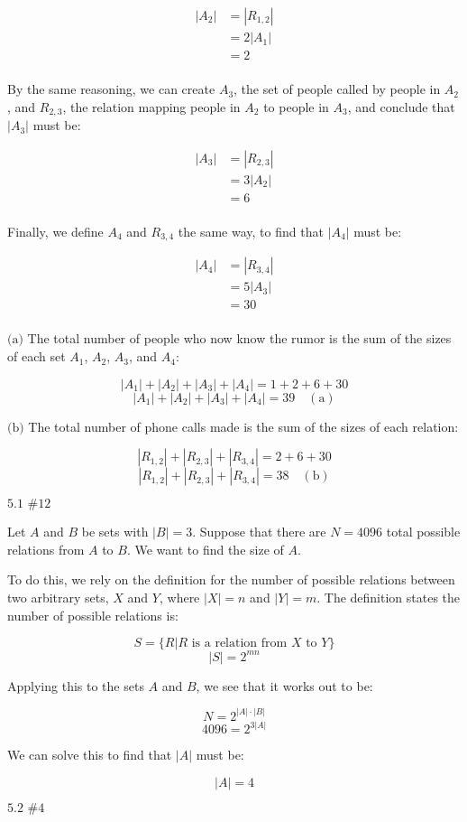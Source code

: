 \documentclass{article}
\newcommand{\problem}[2]{$\boxed{\text{#1 \##2}}$}
\newcommand{\subproblem}[1]{$\boxed{\text{(#1)}}$}
\newcommand{\subsolution}[2]{\boxed{#2\quad(\text{#1})}}
\newcommand{\solution}[1]{\boxed{#1}}
\newcommand{\multistep}[1]{\begin{array}{rl} #1 \end{array}}
\begin{document}
\[
\multistep{
|A_2|&=|R_{1,2}| \\
&= 2|A_1| \\
&= 2 \\
}
\]

By the same reasoning, we can create $A_3$, the set of people called
by people in $A_2$, and $R_{2,3}$, the relation mapping people in
$A_2$ to people in $A_3$, and conclude that $|A_3|$ must be:

\[
\multistep{
|A_3|&=|R_{2,3}| \\
&=3|A_2| \\
&= 6 \\
}
\]

Finally, we define $A_4$ and $R_{3,4}$ the same way, to find that
$|A_4|$ must be:

\[
\multistep{
|A_4|&=|R_{3,4}| \\
&=5|A_3| \\
&=30 \\
}
\]

%
\subproblem{a} The total number of people who now know the rumor is
the sum of the sizes of each set $A_1$, $A_2$, $A_3$, and $A_4$:

\[
|A_1|+|A_2|+|A_3|+|A_4|=1+2+6+30
\] \[
\subsolution{a}{|A_1|+|A_2|+|A_3|+|A_4|=39}
\]

%
\subproblem{b} The total number of phone calls made is the sum of the
sizes of each relation:

\[
|R_{1,2}|+|R_{2,3}|+|R_{3,4}|=2+6+30
\] \[
\subsolution{b}{|R_{1,2}|+|R_{2,3}|+|R_{3,4}|=38}
\]

%
\problem{5.1}{12}

Let $A$ and $B$ be sets with $|B|=3$. Suppose that there are $N=4096$
total possible relations from $A$ to $B$. We want to find the size of
$A$.

To do this, we rely on the definition for the number of possible
relations between two arbitrary sets, $X$ and $Y$, where $|X|=n$ and
$|Y|=m$. The definition states the number of possible relations is:

\[
S=\{ R | \text{$R$ is a relation from $X$ to $Y$} \}
\] \[
|S|=2^{mn}
\]

Applying this to the sets $A$ and $B$, we see that it works out to be:

\[
N=2^{|A|\cdot|B|}
\] \[
4096=2^{3|A|}
\]

We can solve this to find that $|A|$ must be:

\[
\solution{|A|=4}
\]

%
\problem{5.2}{4}
\end{document}
